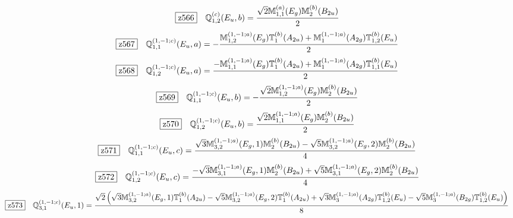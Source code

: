 \documentclass[fleqn,10pt,landscape]{jsarticle}
\begin{document}
\begin{dmath*}
\hspace*{3mm}\fbox{z566}\quad \mathbb{Q}_{1,2}^{(c)}(E_{u},b)=\frac{\sqrt{2} \mathbb{M}_{1,1}^{(a)}(E_{g}) \mathbb{M}_{2}^{(b)}(B_{2u})}{2}
\end{dmath*}
\begin{dmath*}
\hspace*{3mm}\fbox{z567}\quad \mathbb{Q}_{1,1}^{(1,-1;c)}(E_{u},a)=- \frac{\mathbb{M}_{1,2}^{(1,-1;a)}(E_{g}) \mathbb{T}_{1}^{(b)}(A_{2u}) + \mathbb{M}_{1}^{(1,-1;a)}(A_{2g}) \mathbb{T}_{1,2}^{(b)}(E_{u})}{2}
\end{dmath*}
\begin{dmath*}
\hspace*{3mm}\fbox{z568}\quad \mathbb{Q}_{1,2}^{(1,-1;c)}(E_{u},a)=\frac{- \mathbb{M}_{1,1}^{(1,-1;a)}(E_{g}) \mathbb{T}_{1}^{(b)}(A_{2u}) + \mathbb{M}_{1}^{(1,-1;a)}(A_{2g}) \mathbb{T}_{1,1}^{(b)}(E_{u})}{2}
\end{dmath*}
\begin{dmath*}
\hspace*{3mm}\fbox{z569}\quad \mathbb{Q}_{1,1}^{(1,-1;c)}(E_{u},b)=- \frac{\sqrt{2} \mathbb{M}_{1,2}^{(1,-1;a)}(E_{g}) \mathbb{M}_{2}^{(b)}(B_{2u})}{2}
\end{dmath*}
\begin{dmath*}
\hspace*{3mm}\fbox{z570}\quad \mathbb{Q}_{1,2}^{(1,-1;c)}(E_{u},b)=\frac{\sqrt{2} \mathbb{M}_{1,1}^{(1,-1;a)}(E_{g}) \mathbb{M}_{2}^{(b)}(B_{2u})}{2}
\end{dmath*}
\begin{dmath*}
\hspace*{3mm}\fbox{z571}\quad \mathbb{Q}_{1,1}^{(1,-1;c)}(E_{u},c)=\frac{\sqrt{3} \mathbb{M}_{3,2}^{(1,-1;a)}(E_{g},1) \mathbb{M}_{2}^{(b)}(B_{2u}) - \sqrt{5} \mathbb{M}_{3,2}^{(1,-1;a)}(E_{g},2) \mathbb{M}_{2}^{(b)}(B_{2u})}{4}
\end{dmath*}
\begin{dmath*}
\hspace*{3mm}\fbox{z572}\quad \mathbb{Q}_{1,2}^{(1,-1;c)}(E_{u},c)=\frac{- \sqrt{3} \mathbb{M}_{3,1}^{(1,-1;a)}(E_{g},1) \mathbb{M}_{2}^{(b)}(B_{2u}) + \sqrt{5} \mathbb{M}_{3,1}^{(1,-1;a)}(E_{g},2) \mathbb{M}_{2}^{(b)}(B_{2u})}{4}
\end{dmath*}
\begin{dmath*}
\hspace*{3mm}\fbox{z573}\quad \mathbb{Q}_{3,1}^{(1,-1;c)}(E_{u},1)=\frac{\sqrt{2} \left(\sqrt{3} \mathbb{M}_{3,2}^{(1,-1;a)}(E_{g},1) \mathbb{T}_{1}^{(b)}(A_{2u}) - \sqrt{5} \mathbb{M}_{3,2}^{(1,-1;a)}(E_{g},2) \mathbb{T}_{1}^{(b)}(A_{2u}) + \sqrt{3} \mathbb{M}_{3}^{(1,-1;a)}(A_{2g}) \mathbb{T}_{1,2}^{(b)}(E_{u}) - \sqrt{5} \mathbb{M}_{3}^{(1,-1;a)}(B_{2g}) \mathbb{T}_{1,2}^{(b)}(E_{u})\right)}{8}
\end{dmath*}
\end{document}
